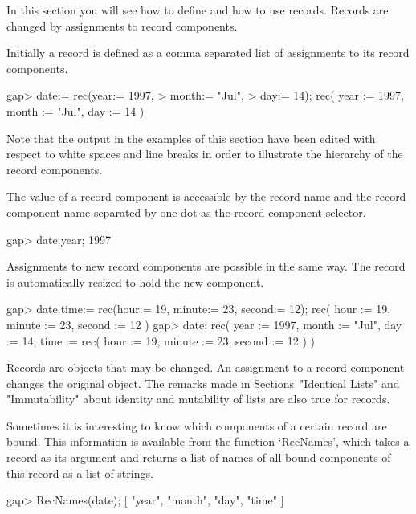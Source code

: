 In this section you will see how to define and how to use records.
Records are changed by assignments to record components.

Initially a record is defined as a comma separated list of assignments to
its record components.

\beginexample
gap> date:= rec(year:= 1997,
>               month:= "Jul",
>               day:= 14);
rec(
  year := 1997,
  month := "Jul",
  day := 14 )
\endexample

Note that the output in the examples of this section have been edited
with respect to white spaces and line breaks in order to illustrate the
hierarchy of the record components.

The value of a record component is accessible by  the record name and the
record  component name separated   by one dot   as  the record  component
selector.

\beginexample
gap> date.year;
1997
\endexample

Assignments to new record components  are possible in  the same way.  The
record is automatically resized to hold the new component.

\beginexample
gap> date.time:= rec(hour:= 19, minute:= 23, second:= 12);
rec(
  hour := 19,
  minute := 23,
  second := 12 )
gap> date;
rec(
  year := 1997,
  month := "Jul",
  day := 14,
  time := rec(
      hour := 19,
      minute := 23,
      second := 12 ) )
\endexample

Records are objects  that  may be  changed.   An assignment to  a  record
component  changes the original  object.
The remarks made in Sections~"Identical Lists" and "Immutability"
about identity and mutability of lists are also true for records.

Sometimes it is interesting to know which  components of a certain record
are  bound.  This information is available  from the function `RecNames',
which  takes a record as  its  argument and  returns  a list of names of
all bound components of this record as a list of strings.

\beginexample
gap> RecNames(date);
[ "year", "month", "day", "time" ]
\endexample

%

